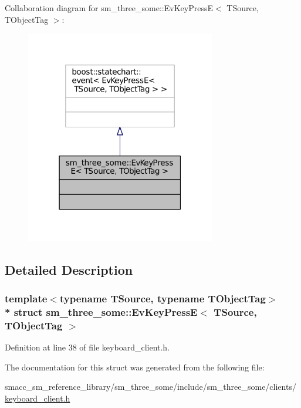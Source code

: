 Collaboration diagram for sm\+\_\+three\+\_\+some\+:\+:Ev\+Key\+PressE$<$ T\+Source, T\+Object\+Tag $>$\+:
\nopagebreak
\begin{figure}[H]
\begin{center}
\leavevmode
\includegraphics[width=235pt]{structsm__three__some_1_1EvKeyPressE__coll__graph}
\end{center}
\end{figure}


\subsection{Detailed Description}
\subsubsection*{template$<$typename T\+Source, typename T\+Object\+Tag$>$\\*
struct sm\+\_\+three\+\_\+some\+::\+Ev\+Key\+Press\+E$<$ T\+Source, T\+Object\+Tag $>$}



Definition at line 38 of file keyboard\+\_\+client.\+h.



The documentation for this struct was generated from the following file\+:\begin{DoxyCompactItemize}
\item 
smacc\+\_\+sm\+\_\+reference\+\_\+library/sm\+\_\+three\+\_\+some/include/sm\+\_\+three\+\_\+some/clients/\hyperlink{keyboard__client_8h}{keyboard\+\_\+client.\+h}\end{DoxyCompactItemize}
